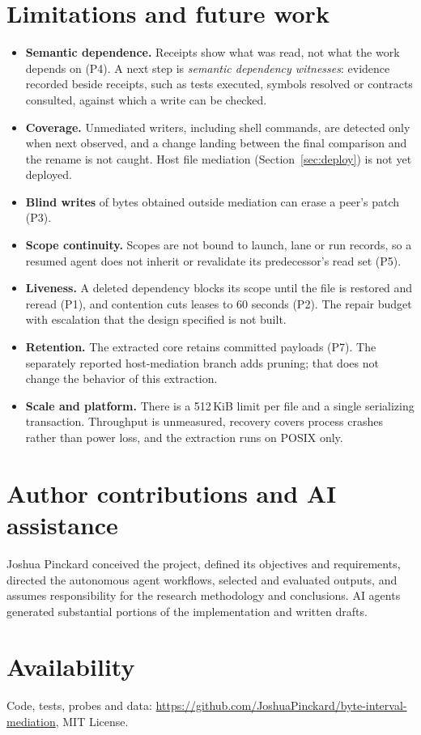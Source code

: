 \documentclass[10pt]{article}
\begin{document}
\section{Limitations and future work}\label{sec:limits}

\begin{itemize}
\item \textbf{Semantic dependence.} Receipts show what was read, not what the work depends on (P4). A next step is \emph{semantic dependency witnesses}: evidence recorded beside receipts, such as tests executed, symbols resolved or contracts consulted, against which a write can be checked.
\item \textbf{Coverage.} Unmediated writers, including shell commands, are detected only when next observed, and a change landing between the final comparison and the rename is not caught. Host file mediation (Section~\ref{sec:deploy}) is not yet deployed.
\item \textbf{Blind writes} of bytes obtained outside mediation can erase a peer's patch (P3).
\item \textbf{Scope continuity.} Scopes are not bound to launch, lane or run records, so a resumed agent does not inherit or revalidate its predecessor's read set (P5).
\item \textbf{Liveness.} A deleted dependency blocks its scope until the file is restored and reread (P1), and contention cuts leases to 60 seconds (P2). The repair budget with escalation that the design specified is not built.
\item \textbf{Retention.} The extracted core retains committed payloads (P7). The separately reported host-mediation branch adds pruning; that does not change the behavior of this extraction.
\item \textbf{Scale and platform.} There is a 512\,KiB limit per file and a single serializing transaction. Throughput is unmeasured, recovery covers process crashes rather than power loss, and the extraction runs on POSIX only.
\end{itemize}

\section*{Author contributions and AI assistance}
Joshua Pinckard conceived the project, defined its objectives and requirements, directed the autonomous agent workflows, selected and evaluated outputs, and assumes responsibility for the research methodology and conclusions. AI agents generated substantial portions of the implementation and written drafts.

\section*{Availability}
Code, tests, probes and data: \url{https://github.com/JoshuaPinckard/byte-interval-mediation}, MIT License.



\end{document}
